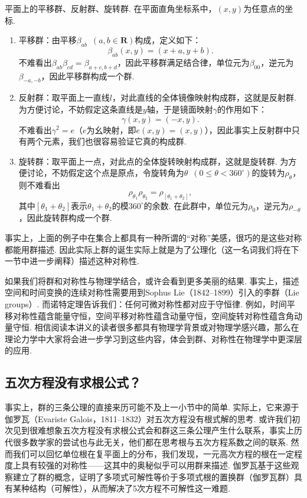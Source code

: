 \begin{example}{}{}
    平面上的平移群、反射群、旋转群. 在平面直角坐标系中，$(x,y)$为任意点的坐标.
    \begin{enumerate}
        \item 平移群：由平移$\beta_{ab}\enspace(a,b\in\mathbf{R})$构成，定义如下：
              \[\beta_{ab}(x,y)=(x+a,y+b).\]
              不难看出$\beta_{ab}\beta_{cd}=\beta_{a+c,b+d}$，因此平移群满足结合律，单位元为$\beta_{00}$，逆元为$\beta_{-a,-b}$，因此平移群构成一个群.

        \item 反射群：取平面上一直线$l$，对此直线的全体镜像映射构成群，这就是反射群. 为方便讨论，不妨假定这条直线是$y$轴，于是镜面映射$\gamma$的作用如下：
              \[\gamma(x,y)=(-x,y).\]
              不难看出$\gamma^2=e$（$e$为幺映射，即$e(x,y)=(x,y)$），因此事实上反射群中只有两个元素，我们也很容易验证它真的构成群.

        \item 旋转群：取平面上一点，对此点的全体旋转映射构成群，这就是旋转群. 为方便讨论，不妨假定这个点是原点，令旋转角为$\theta\enspace(0\leqslant\theta<360^\circ)$的旋转为$\rho_\theta$，则不难看出
              \[\rho_{\theta_1}\rho_{\theta_2}=\rho_{[\theta_1+\theta_2]},\]
              其中$[\theta_1+\theta_2]$表示$\theta_1+\theta_2$的模$360^\circ$的余数. 在此群中，单位元为$\rho_0$，逆元为$\rho_{-\theta}$，因此旋转群构成一个群.
    \end{enumerate}
\end{example}

事实上，上面的例子中在集合上都具有一种所谓的``对称''美感，很巧的是这些对称都能用群描述. 因此实际上群的诞生实际上就是为了公理化（这一名词我们将在下一节中进一步阐释）描述这种对称性.

如果我们将群和对称性与物理学结合，或许会看到更多美丽的结果. 事实上，描述空间和时间变换的连续对称性需要用到Sophus Lie（1842--1899）引入的李群（Lie groups）. 而诺特定理告诉我们：任何可微对称性都对应于守恒律. 例如，时间平移对称性蕴含能量守恒，空间平移对称性蕴含动量守恒，空间旋转对称性蕴含角动量守恒. 相信阅读本讲义的读者很多都具有物理学背景或对物理学感兴趣，那么在理论力学中大家将会进一步学习到这些内容，体会到群、对称性在物理学中更深层的应用.

\subsection{五次方程没有求根公式？}
事实上，群的三条公理的直接来历可能不及上一小节中的简单. 实际上，它来源于伽罗瓦（Evariste Galois，1811--1832）对五次方程没有根式解的思考. 或许我们初次见到很难想象五次方程没有求根公式会和群这三条公理产生什么联系，事实上历代很多数学家的尝试也与此无关，他们都在思考根与五次方程系数之间的联系. 然而我们可以回忆单位根在复平面上的分布，我们发现，一元高次方程的根在一定程度上具有较强的对称性——这其中的奥秘似乎可以用群来描述. 伽罗瓦基于这些观察建立了群的概念，证明了多项式可解性等价于多项式根的置换群（伽罗瓦群）具有某种结构（可解性），从而解决了5次方程不可解性这一难题.

